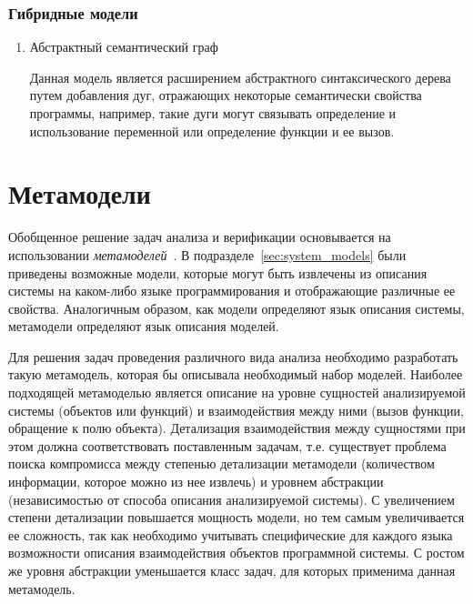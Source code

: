 \subsubsection{Гибридные модели}
\begin{enumerate}
    \item Абстрактный семантический граф

    Данная модель является расширением абстрактного синтаксического дерева путем
    добавления дуг, отражающих некоторые семантически свойства программы,
    например, такие дуги могут связывать определение и использование переменной
    или определение функции и ее вызов.
\end{enumerate}

\section{Метамодели}
\label{sec:metamodels}

Обобщенное решение задач анализа и верификации основывается на использовании
\emph{метамоделей}~\cite{metamodeling}. В подразделе~\ref{sec:system_models}
были приведены возможные модели, которые могут быть извлечены из описания
системы на каком-либо языке программирования и отображающие различные ее
свойства. Аналогичным образом, как модели определяют язык описания системы,
метамодели определяют язык описания моделей.

Для решения задач проведения различного вида анализа необходимо разработать
такую метамодель, которая бы описывала необходимый набор моделей. Наиболее
подходящей метамоделью является описание на уровне сущностей анализируемой
системы (объектов или функций) и взаимодействия между ними (вызов функции,
обращение к полю объекта). Детализация взаимодействия между сущностями при этом
должна соответствовать поставленным задачам, т.е. существует проблема поиска
компромисса между степенью детализации метамодели (количеством информации,
которое можно из нее извлечь) и уровнем абстракции (независимостью от способа
описания анализируемой системы). С увеличением степени детализации повышается
мощность модели, но тем самым увеличивается ее сложность, так как необходимо
учитывать специфические для каждого языка возможности описания взаимодействия
объектов программной системы. С ростом же уровня абстракции уменьшается класс
задач, для которых применима данная метамодель.

